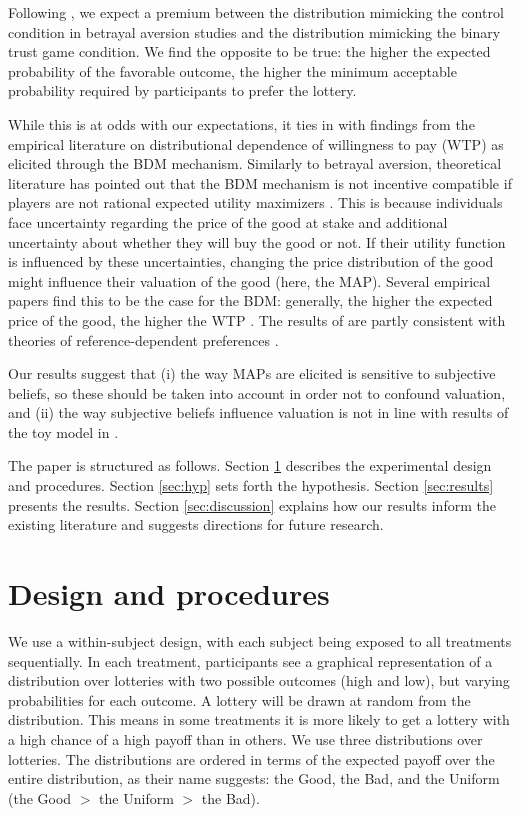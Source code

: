 \documentclass[pdftex,12pt, a4paper]{article}
\begin{document}
Following \cite{Li2020a}, we expect a premium between the distribution mimicking the control condition in betrayal aversion studies and the distribution mimicking the binary trust game condition.
We find the opposite to be true: the higher the expected probability of the favorable outcome, the higher the minimum acceptable probability required by participants to prefer the lottery.

While this is at odds with our expectations, it ties in with findings from the empirical literature on distributional dependence of willingness to pay (WTP) as elicited through the BDM mechanism.
Similarly to betrayal aversion, theoretical literature has pointed out that the BDM mechanism is not incentive compatible if players are not rational expected utility maximizers \citep{Karni1987,Horowitz2006}.
This is because individuals face uncertainty regarding the price of the good at stake and additional uncertainty about whether they will buy the good or not.
If their utility function is influenced by these uncertainties, changing the price distribution of the good might influence their valuation of the good (here, the MAP).
Several empirical papers find this to be the case for the BDM: generally, the higher the expected price of the good, the higher the WTP \citep[for a short review of this literature, see][]{Tymula2016}.
The results of \cite{Tymula2016} are partly consistent with theories of reference-dependent preferences \citep{Koszegi2006, Koszegi2007, Wenner2015}.

Our results suggest that (i) the way MAPs are elicited is sensitive to subjective beliefs, so these should be taken into account in order not to confound valuation, and (ii) the way subjective beliefs influence valuation is not in line with results of the toy model in \cite{Li2020a}.

The paper is structured as follows.
Section \ref{sec:proced} describes the experimental design and procedures.
Section \ref{sec:hyp} sets forth the hypothesis.
Section \ref{sec:results} presents the results.
Section \ref{sec:discussion} explains how our results inform the existing literature and suggests directions for future research.


\section{Design and procedures}\label{sec:proced}
We use a within-subject design, with each subject being exposed to all treatments sequentially.
In each treatment, participants see a graphical representation of a distribution over lotteries with two possible outcomes (high and low), but varying probabilities for each outcome.
A lottery will be drawn at random from the distribution.
This means in some treatments it is more likely to get a lottery with a high chance of a high payoff than in others.
We use three distributions over lotteries.
The distributions are ordered in terms of the expected payoff over the entire distribution, as their name suggests: the Good, the Bad, and the Uniform (the Good $>$ the Uniform $>$ the Bad).
\end{document}
